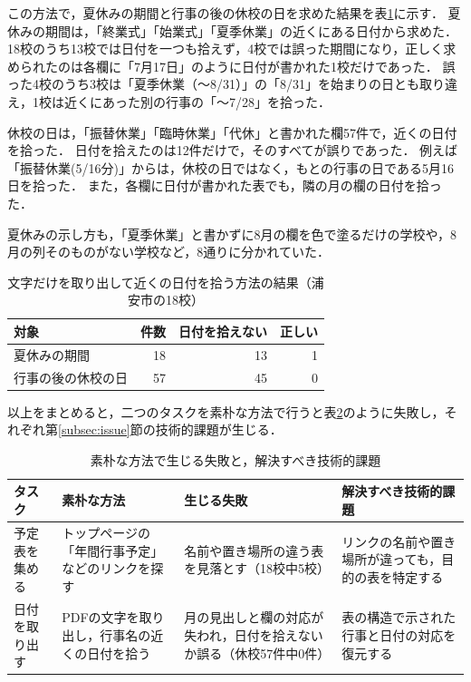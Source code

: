 \documentclass[a4paper,12pt,oneside]{jex}
\begin{document}
この方法で，夏休みの期間と行事の後の休校の日を求めた結果を表\ref{tab:moji}に示す．
夏休みの期間は，「終業式」「始業式」「夏季休業」の近くにある日付から求めた．
18校のうち13校では日付を一つも拾えず，4校では誤った期間になり，正しく求められたのは各欄に「7月17日」のように日付が書かれた1校だけであった．
誤った4校のうち3校は「夏季休業（～8/31）」の「8/31」を始まりの日とも取り違え，1校は近くにあった別の行事の「～7/28」を拾った．

休校の日は，「振替休業」「臨時休業」「代休」と書かれた欄57件で，近くの日付を拾った．
日付を拾えたのは12件だけで，そのすべてが誤りであった．
例えば「振替休業(5/16分)」からは，休校の日ではなく，もとの行事の日である5月16日を拾った．
また，各欄に日付が書かれた表でも，隣の月の欄の日付を拾った．

夏休みの示し方も，「夏季休業」と書かずに8月の欄を色で塗るだけの学校や，8月の列そのものがない学校など，8通りに分かれていた．

\begin{table}[htbp]
\centering
\caption{文字だけを取り出して近くの日付を拾う方法の結果（浦安市の18校）}
\label{tab:moji}
\begin{tabular}{lrrr}
\toprule
対象 & 件数 & 日付を拾えない & 正しい \\
\midrule
夏休みの期間 & 18 & 13 & 1 \\
行事の後の休校の日 & 57 & 45 & 0 \\
\bottomrule
\end{tabular}
\end{table}

以上をまとめると，二つのタスクを素朴な方法で行うと表\ref{tab:naive}のように失敗し，それぞれ第\ref{subsec:issue}節の技術的課題が生じる．

\begin{table}[htbp]
\centering
\caption{素朴な方法で生じる失敗と，解決すべき技術的課題}
\label{tab:naive}
{\small\setlength{\tabcolsep}{3pt}
\begin{tabular}{p{17mm}p{38mm}p{40mm}p{44mm}}
\toprule
\raggedright タスク & \raggedright 素朴な方法 & \raggedright 生じる失敗 & \raggedright 解決すべき技術的課題 \tabularnewline
\midrule
\raggedright 予定表を集める & \raggedright トップページの「年間行事予定」などのリンクを探す & \raggedright 名前や置き場所の違う表を見落とす（18校中5校） & \raggedright リンクの名前や置き場所が違っても，目的の表を特定する \tabularnewline
\raggedright 日付を取り出す & \raggedright PDFの文字を取り出し，行事名の近くの日付を拾う & \raggedright 月の見出しと欄の対応が失われ，日付を拾えないか誤る（休校57件中0件） & \raggedright 表の構造で示された行事と日付の対応を復元する \tabularnewline
\bottomrule
\end{tabular}}
\end{table}
\end{document}
